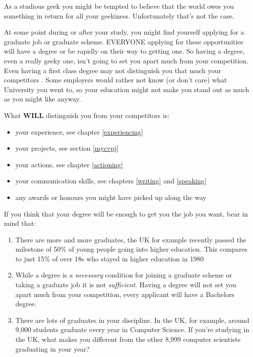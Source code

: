 \documentclass[
]{book}
\providecommand{\tightlist}{%
  \setlength{\itemsep}{0pt}\setlength{\parskip}{0pt}}
\begin{document}
As a studious geek you might be tempted to believe that the world owes you something in return for all your geekiness. Unfortunately that's not the case.

At some point during or after your study, you might find yourself applying for a graduate job or graduate scheme. EVERYONE applying for these opportunities will have a degree or be rapidly on their way to getting one. So having a degree, even a really geeky one, isn't going to set you apart much from your competition. Even having a first class degree may not distinguish you that much your competitors \citep{gradeinflation, firstclass}. Some employers would rather not know (or don't care) what University you went to, so your education might not make you stand out as much as you might like anyway. \citep{bigfour, eyfirm}

What \textbf{WILL} distinguish you from your competitors is:

\begin{itemize}
\tightlist
\item
  your experience, see chapter \ref{experiencing}
\item
  your projects, see section \ref{mycvpj}
\item
  your actions, see chapter \ref{actioning}
\item
  your communication skills, see chapters \ref{writing} and \ref{speaking}
\item
  any awards or honours you might have picked up along the way
\end{itemize}

If you think that your degree will be enough to get you the job you want, bear in mind that:

\begin{enumerate}
\def\labelenumi{\arabic{enumi}.}
\tightlist
\item
  There are more and more graduates, the UK for example recently passed the milestone of 50\% of young people going into higher education. This compares to just 15\% of over 18s who stayed in higher education in 1980 \citep{lotsofgrads}
\item
  While a degree is a \emph{necessary} condition for joining a graduate scheme or taking a graduate job it is not \emph{sufficient}. Having a degree will not set you apart much from your competition, every applicant will have a Bachelors degree.
\item
  There are lots of graduates in your discipline. In the UK, for example, around 9,000 students graduate every year in Computer Science. If you're studying in the UK, what makes you different from the other 8,999 computer scientists graduating in your year?
\end{enumerate}
\end{document}
